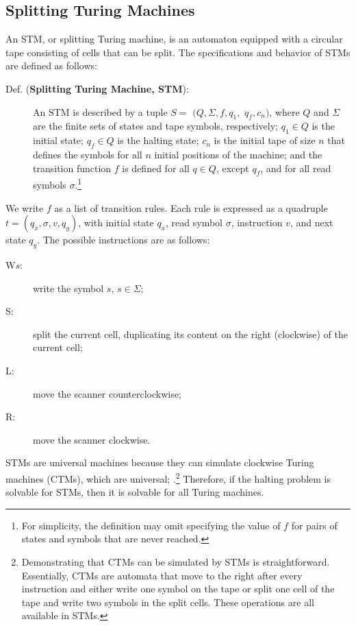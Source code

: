 \documentclass[%
  manuscript=article,   %
  year=2024,
  volume=77,
  doi=00000.000,
]{zfn}
\begin{document}
\subsection{Splitting Turing Machines}\label{STMsec}

An STM, or splitting Turing machine, is an automaton equipped with a circular tape consisting of cells that can be split. The specifications and behavior of STMs are defined as follows:

\begin{description}
\item[Def. (\textbf{Splitting Turing Machine, STM}):] An \label{DefSTM} STM is described by a tuple $S =$ $(Q, \Sigma, f, q_1,$ $q_f, c_n)$, where $Q$ and $\Sigma$ are the finite sets of states and tape symbols, respectively; $q_1\in Q$ is the initial state; $q_f \in Q$ is the halting state; $c_n$ is the initial tape of size $n$ that defines the symbols for all $n$ initial positions of the machine; and the transition function $f$
is defined for all $q\in Q$, except $q_f$, and for all read symbols $\sigma$.\footnote{For simplicity, the definition may omit specifying the value of $f$ for pairs of states and symbols that are never reached.}
\end{description}

We write $f$ as a list of transition rules. Each rule is expressed as a quadruple $t = (q_x, \sigma, v, q_y)$, with initial state $q_x$, read symbol $\sigma$, instruction $v$, and next state $q_y$. The possible instructions are as follows:

\begin{description}
\item[W$s$:] write the symbol $s$, $s \in \Sigma$;
\item[S:] split the current cell, duplicating its content on the right (clockwise) of the current cell;
\item[L:] move the scanner counterclockwise;
\item[R:] move the scanner clockwise.
\end{description}

STMs are universal machines because they can simulate clockwise Turing machines (CTMs), which are universal; \parencite[cf.][pp.107-109]{Neary}.\footnote{Demonstrating that CTMs can be simulated by STMs is straightforward. Essentially, CTMs are automata that move to the right after every instruction and either write one symbol on the tape or split one cell of the tape and write two symbols in the split cells. These operations are all available in STMs.} Therefore, if the halting problem is solvable for STMs, then it is solvable for all Turing machines.
\end{document}
